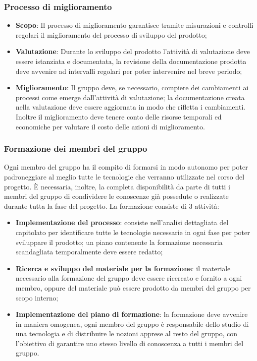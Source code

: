 \subsubsection{Processo di miglioramento}
\begin{itemize}
\item \textbf{Scopo}: Il processo di miglioramento garantisce tramite misurazioni e controlli regolari il miglioramento del processo di sviluppo del prodotto;

\item \textbf{Valutazione}: Durante lo sviluppo del prodotto l'attività di valutazione deve essere istanziata e documentata, la revisione della documentazione prodotta deve avvenire ad intervalli regolari per poter intervenire nel breve periodo;

\item \textbf{Miglioramento}: Il gruppo deve, se necessario, compiere dei cambiamenti ai processi come emerge dall'attività di valutazione; la documentazione creata nella valutazione deve essere aggiornata in modo che rifletta i cambiamenti.\\
Inoltre il miglioramento deve tenere conto delle risorse temporali ed economiche per valutare il costo delle azioni di miglioramento.
\end{itemize}

\subsubsection{Formazione dei membri del gruppo}
 Ogni membro del gruppo ha il compito di formarsi in modo autonomo per poter padroneggiare al meglio tutte le tecnologie che verranno utilizzate nel corso del progetto.
È necessaria, inoltre, la completa disponibilità da parte di tutti i membri del gruppo di condividere le conoscenze già possedute o realizzate durante tutta la fase del progetto.
La formazione consiste di 3 attività:
\begin{itemize}
	\item \textbf{Implementazione del processo}: consiste nell'analisi dettagliata del capitolato per identificare tutte le tecnologie necessarie in ogni fase per poter sviluppare il prodotto; un piano contenente la formazione necessaria scandagliata temporalmente deve essere redatto;
	\item \textbf{Ricerca e sviluppo del materiale per la formazione}: il materiale necessario alla formazione del gruppo deve essere ricercato e fornito a ogni membro, oppure del materiale può essere prodotto da membri del gruppo per scopo interno;
	\item \textbf{Implementazione del piano di formazione}: la formazione deve avvenire in maniera omogenea, ogni membro del gruppo è responsabile dello studio di una tecnologia e di distribuire le nozioni apprese al resto del gruppo, con l'obiettivo di garantire uno stesso livello di conoscenza a tutti i membri del gruppo.
\end{itemize}

